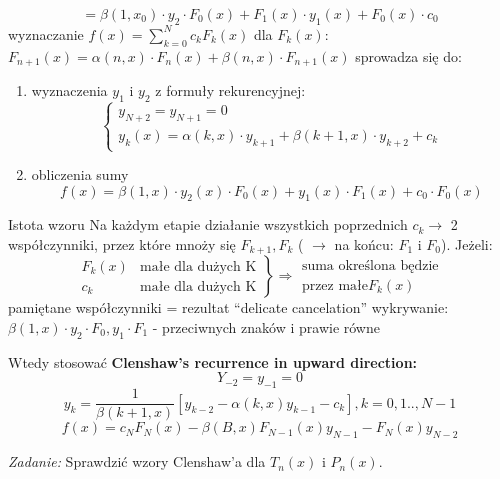 \begin{frame}
	$$=\beta(1,x_0) \cdot y_2 \cdot F_0(x)+F_1(x) \cdot y_1(x) +F_0(x) \cdot c_0 $$
    wyznaczanie $f(x) = \sum_{k=0}^{N}c_kF_k(x)$ \newline
    dla $F_k(x)$: $F_{n+1}(x) = \alpha(n,x) \cdot F_n(x) + \beta(n,x) \cdot F_{n+1}(x)$ \newline
    sprowadza się do:
    \begin{enumerate}
    \item wyznaczenia $y_1$ i $y_2$ z formuły rekurencyjnej: \newline
    	$$\left\{\begin{array}{l}
    	y_{N+2} = y_{N+1} = 0 \\
        y_k(x) = \alpha(k,x) \cdot y_{k+1} + \beta(k+1,x) \cdot y_{k+2} +c_k
    	\end{array}\right.$$
     \item obliczenia sumy \newline
     $$f(x) = \beta(1,x) \cdot y_2(x) \cdot F_0(x) + y_1(x) \cdot F_1(x) + c_0 \cdot F_0(x)$$
    \end{enumerate}
\end{frame}
\begin{frame}{Istota wzoru}
	Na każdym etapie działanie wszystkich poprzednich $c_k \rightarrow$ 2 współczynniki, przez które mnoży się $F_{k+1},F_k$ ( $\rightarrow$ na końcu: $F_1$ i $F_0$).\newline
    Jeżeli:
    $$\left.\begin{array}{cl}
    	F_k(x) & \text{małe dla dużych K} \\
        c_k & \text{małe dla dużych K}
    \end{array}\right\} \Rightarrow\left.\begin{array}{c}
    	 \text{suma określona będzie} \\
         \text{przez małe} F_k(x)
    \end{array}\right.$$
    pamiętane współczynniki = rezultat ``delicate cancelation'' \newline
    wykrywanie: $\beta(1,x) \cdot y_2 \cdot F_0,y_1 \cdot F_1$ - przeciwnych znaków i prawie równe
\end{frame}
\begin{frame}
	Wtedy stosować \textbf{Clenshaw's recurrence in upward direction:}
    $$Y_{-2} = y_{-1} = 0$$
    $$y_k = \frac{1}{\beta(k+1,x)}[y_{k-2}-\alpha(k,x)y_{k-1} - c_k], k=0,1..,N-1$$
    $$f(x) = c_NF_N(x) - \beta(B,x)F_{N-1}(x)y_{N-1} - F_N(x)y_{N-2}$$
    \begin{flushright}
    	\textit{Zadanie: } \quad Sprawdzić wzory Clenshaw'a dla $T_n(x)$ i $P_n(x)$.
    \end{flushright}
\end{frame}
